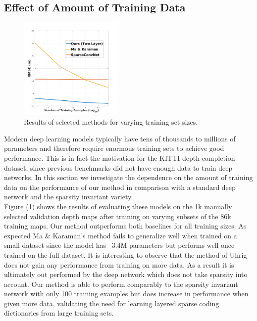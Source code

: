 \subsection{Effect of Amount of Training Data}
\label{sec:effect-training-data}
\begin{figure}
\centering
\includegraphics[width=0.45\textwidth]{trainsize_plot}
  \caption{Results of selected methods for varying training set sizes.}
  \label{fig:trainsize}
\end{figure}
Modern deep learning models typically have tens of thousands to millions of parameters and therefore require enormous training sets to achieve good performance. This is in fact the motivation for the KITTI depth completion dataset, since previous benchmarks did not have enough data to train deep networks. In this section we investigate the dependence on the amount of training data on the performance of our method in comparison with a standard deep network and the sparsity invariant variety.\\
Figure (\ref{fig:trainsize}) shows the results of evaluating these models on the 1k manually selected validation depth maps after training on varying subsets of the 86k training maps. Our method outperforms both baselines for all training sizes. As expected Ma \& Karaman's method fails to generalize well when trained on a small dataset since the model has ~3.4M parameters but performs well once trained on the full dataset. It is interesting to observe that the method of Uhrig \etal does not gain any performance from training on more data. As a result it is ultimately out performed by the deep network which does not take sparsity into account. Our method is able to perform comparably to the sparsity invariant network with only 100 training examples but does increase in performance when given more data, validating the need for learning layered sparse coding dictionaries from large training sets. 
